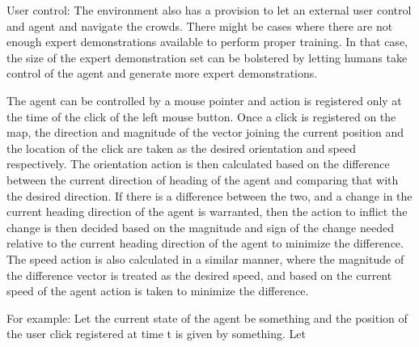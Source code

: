 User control:
The environment also has a provision to let an external user control and agent and navigate the crowds. There might be cases where there are not enough expert demonstrations available to perform proper training. In that case, the size of the expert demonstration set can be bolstered by letting humans take control of the agent and generate more expert demonstrations. 

The agent can be controlled by a mouse pointer and action is registered only at the time of the click of the left mouse button. Once a click is registered on the map, the direction and magnitude of the vector joining the current position and the location of the click are taken as the desired orientation and speed respectively.  
The orientation action is then calculated based on the difference between the current direction of heading of the agent and comparing that with the desired direction. If there is a difference between the two, and a change in the current heading direction of the agent is warranted, then the action to inflict the change is then decided based on the magnitude and sign of the change needed relative to the current heading direction of the agent to minimize the difference.
The speed action is also calculated in a similar manner, where the magnitude of the difference vector is treated as the desired speed, and based on the current speed of the agent action is taken to minimize the difference.

For example:
Let the current state of the agent be something and the position of the user click registered at time t is given by something. Let 



